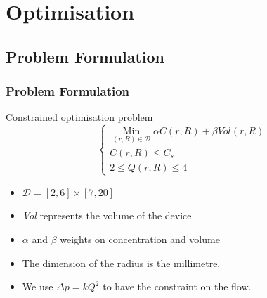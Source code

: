   \section{Optimisation}

  \subsection{Problem Formulation}
  \begin{frame}
  \frametitle{Problem Formulation}
  \begin{block}{Constrained optimisation problem}
  \begin{equation}
	\begin{cases}
  \mathop{Min}\limits _{(r,R)\in \mathcal{D}} \alpha C(r,R) + \beta Vol(r,R) \\
  C(r,R) \leq C_s\\
  2 \leq Q(r,R) \leq 4
	\end{cases}
  \end{equation}
  \end{block}

  \begin{itemize}
  \item $ \mathcal{D} = [2,6] \times [7,20]$
  \item  \emph{Vol} represents the volume of the device
  \item  $\alpha$ and $\beta$ weights on concentration and volume
  \item The dimension of the radius is the millimetre.\\
  \item We use $\Delta p = kQ^2$ to have the constraint on the flow.
  \end{itemize}
  \end{frame}


